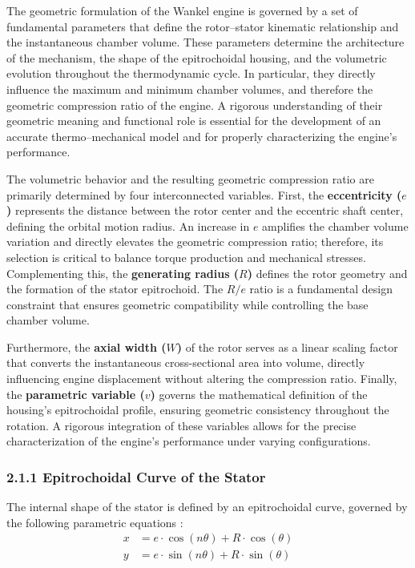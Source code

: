 \documentclass[man,floatsintext,noextraspace]{apa6}
\begin{document}
The geometric formulation of the Wankel engine is governed by a set of fundamental parameters that define the rotor–stator kinematic relationship and the instantaneous chamber volume. These parameters determine the architecture of the mechanism, the shape of the epitrochoidal housing, and the volumetric evolution throughout the thermodynamic cycle. In particular, they directly influence the maximum and minimum chamber volumes, and therefore the geometric compression ratio of the engine. A rigorous understanding of their geometric meaning and functional role is essential for the development of an accurate thermo–mechanical model and for properly characterizing the engine’s performance. 

The volumetric behavior and the resulting geometric compression ratio are primarily determined by four interconnected variables. First, the \textbf{eccentricity ($e$)} represents the distance between the rotor center and the eccentric shaft center, defining the orbital motion radius. An increase in $e$ amplifies the chamber volume variation and directly elevates the geometric compression ratio; therefore, its selection is critical to balance torque production and mechanical stresses. Complementing this, the \textbf{generating radius ($R$)} defines the rotor geometry and the formation of the stator epitrochoid. The $R/e$ ratio is a fundamental design constraint that ensures geometric compatibility while controlling the base chamber volume.


Furthermore, the \textbf{axial width ($W$)} of the rotor serves as a linear scaling factor that converts the instantaneous cross-sectional area into volume, directly influencing engine displacement without altering the compression ratio. Finally, the \textbf{parametric variable ($v$)} governs the mathematical definition of the housing's epitrochoidal profile, ensuring geometric consistency throughout the rotation. A rigorous integration of these variables allows for the precise characterization of the engine’s performance under varying configurations.

\subsubsection{2.1.1 Epitrochoidal Curve of the Stator}

The internal shape of the stator is defined by an epitrochoidal curve, governed by the following parametric equations \cite{yamamoto1981}:
\begin{align}
x &= e \cdot \cos(n\theta) + R \cdot \cos(\theta) \\
y &= e \cdot \sin(n\theta) + R \cdot \sin(\theta)
\end{align}
\end{document}

